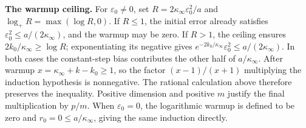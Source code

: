 \documentclass[11pt,a4paper]{article}
\begin{document}
\textbf{The warmup ceiling.} For \(\varepsilon_0\ne0\), set \(R=2\kappa_\infty\varepsilon_0^2/a\) and \(\log_+R=\max(\log R,0)\). If \(R\le1\), the initial error already satisfies \(\varepsilon_0^2\le a/(2\kappa_\infty)\), and the warmup may be zero. If \(R>1\), the ceiling ensures \(2k_0/\kappa_\infty\ge\log R\); exponentiating its negative gives \(e^{-2k_0/\kappa_\infty}\varepsilon_0^2\le a/(2\kappa_\infty)\). In both cases the constant-step bias contributes the other half of \(a/\kappa_\infty\). After warmup \(x=\kappa_\infty+k-k_0\ge1\), so the factor \((x-1)/(x+1)\) multiplying the induction hypothesis is nonnegative. The rational calculation above therefore preserves the inequality. Positive dimension and positive \(m\) justify the final multiplication by \(p/m\). When \(\varepsilon_0=0\), the logarithmic warmup is defined to be zero and \(r_0=0\le a/\kappa_\infty\), giving the same induction directly.
\end{document}

